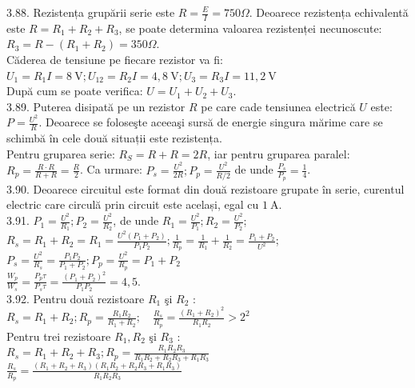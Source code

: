3.88. Rezistența grupării serie este $R=\frac{E}{I}=750 \Omega$. Deoarece rezistența echivalentă este $R=R_{1}+R_{2}+R_{3}$, se poate determina valoarea rezistenței necunoscute: $R_{3}=R-\left(R_{1}+R_{2}\right)=350 \Omega$.\\ Căderea de tensiune pe fiecare rezistor va fi:\\ $U_{1}=R_{1} I=8 \mathrm{~V} ; U_{12}=R_{2} I=4,8 \mathrm{~V} ; U_{3}=R_{3} I=11,2 \mathrm{~V}$\\ După cum se poate verifica: $U=U_{1}+U_{2}+U_{3}$.\\

3.89. Puterea disipată pe un rezistor $R$ pe care cade tensiunea electrică $U$ este: $P=\frac{U^{2}}{R}$. Deoarece se foloseşte aceeaşi sursă de energie singura mărime care se schimbă în cele două situații este rezistența.\\ Pentru gruparea serie: $R_{S}=R+R=2 R$, iar pentru gruparea paralel: $R_{p}=\frac{R \cdot R}{R+R}=\frac{R}{2}$. Ca urmare: $P_{s}=\frac{U^{2}}{2 R} ; P_{p}=\frac{U^{2}}{R / 2}$ de unde $\frac{P_{s}}{P_{p}}=\frac{1}{4}$.\\

3.90. Deoarece circuitul este format din două rezistoare grupate în serie, curentul electric care circulă prin circuit este același, egal cu $1 \mathrm{~A}$.\\

3.91. $P_{1}=\frac{U^{2}}{R_{1}} ; P_{2}=\frac{U^{2}}{R_{2}}$, de unde $R_{1}=\frac{U^{2}}{P_{1}} ; R_{2}=\frac{U^{2}}{P_{2}}$;\\ $R_{s}=R_{1}+R_{2}=R_{1}=\frac{U^{2}\left(P_{1}+P_{2}\right)}{P_{1} P_{2}} ; \frac{1}{R_{p}}=\frac{1}{R_{1}}+\frac{1}{R_{2}}=\frac{P_{1}+P_{2}}{U^{2}}$;\\ $P_{s}=\frac{U^{2}}{R_{s}}=\frac{P_{1} P_{2}}{P_{1}+P_{2}} ; P_{p}=\frac{U^{2}}{R_{p}}=P_{1}+P_{2}$\\ $\frac{W_{p}}{W_{s}}=\frac{P_{p} \tau}{P_{s} \tau}=\frac{\left(P_{1}+P_{2}\right)^{2}}{P_{1} P_{2}}=4,5$.\\

3.92. Pentru două rezistoare $R_{1}$ şi $R_{2}$ :\\ $R_{s}=R_{1}+R_{2} ; R_{p}=\frac{R_{1} R_{2}}{R_{1}+R_{2}} ; \quad \frac{R_{s}}{R_{p}}=\frac{\left(R_{1}+R_{2}\right)^{2}}{R_{1} R_{2}}>2^{2}$\\ Pentru trei rezistoare $R_{1}, R_{2}$ şi $R_{3}$ :\\ $R_{s}=R_{1}+R_{2}+R_{3} ; R_{p}=\frac{R_{1} R_{2} R_{3}}{R_{1} R_{2}+R_{2} R_{3}+R_{1} R_{3}}$\\ $\frac{R_{s}}{R_{p}}=\frac{\left(R_{1}+R_{2}+R_{3}\right)\left(R_{1} R_{2}+R_{2} R_{3}+R_{1} R_{3}\right)}{R_{1} R_{2} R_{3}}$

